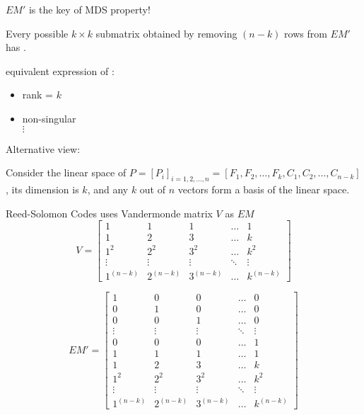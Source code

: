 \documentclass[slidestop,compress,mathserif]{beamer}
\begin{document}
\begin{frame}[options]
{}


{
$EM'$ is the key of MDS property!
}

{
\begin{theorem}
  Every possible $k \times k$ submatrix obtained by removing $(n-k)$ rows from $EM'$ has {\color{red}{full rank}}.

equivalent expression of {\color{red}{full rank}}:
\begin{itemize}
  \item rank = $k$
  \item non-singular \\
$\vdots$
\end{itemize}

\end{theorem}

Alternative view:

Consider the linear space of $P = [P_{i}]_{i=1,2,\dots,n} = [F_{1}, F_{2}, \dots, F_{k}, C_{1}, C_{2}, \dots, C_{n-k}]$,
its dimension is $k$, and any $k$ out of $n$ vectors form a basis of the linear space.
}

{
Reed-Solomon Codes uses Vandermonde matrix $V$ as $EM$
$$
V =
\begin{bmatrix}
1 & 1 & 1 & \ldots & 1 \\
1 & 2 & 3 & \ldots & k \\
1^2 & 2^2 & 3^2 & \ldots & k^2 \\
\vdots & \vdots & \vdots & \ddots & \vdots \\
1^{(n-k)} & 2^{(n-k)} & 3^{(n-k)} & \ldots & k^{(n-k)}
\end{bmatrix}
$$
}

{
$$
EM' =
\begin{bmatrix}
1 & 0 & 0 & \ldots & 0 \\
0 & 1 & 0 & \ldots & 0 \\
0 & 0 & 1 & \ldots & 0 \\
\vdots & \vdots & \vdots & \ddots & \vdots \\
0 & 0 & 0 & \ldots & 1 \\
1 & 1 & 1 & \ldots & 1 \\
1 & 2 & 3 & \ldots & k \\
1^2 & 2^2 & 3^2 & \ldots & k^2 \\
\vdots & \vdots & \vdots & \ddots & \vdots \\
1^{(n-k)} & 2^{(n-k)} & 3^{(n-k)} & \ldots & k^{(n-k)}
\end{bmatrix}
$$

}
\end{frame}
\end{document}

